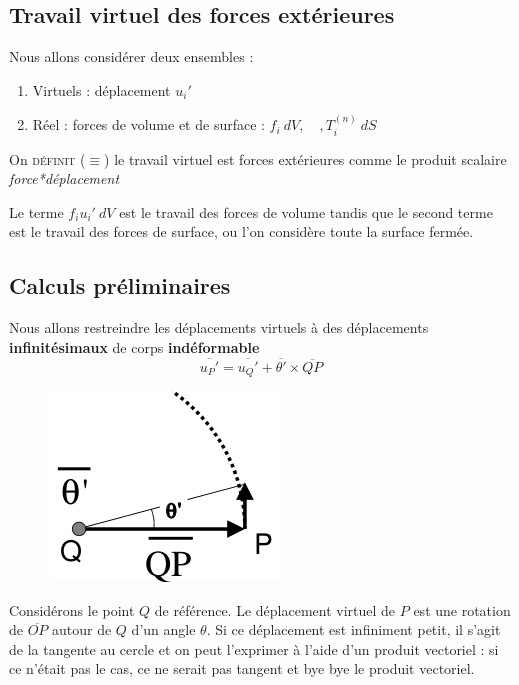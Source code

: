	
	\subsection{Travail virtuel des forces extérieures}
	Nous allons considérer deux ensembles :
	\begin{enumerate}
	\item Virtuels : déplacement $u_i'$
	\item Réel : forces de volume et de surface : $f_i\ dV,\quad, T_i^{(n)}\ dS$
	\end{enumerate}
	On \textsc{définit} ($\equiv$) le travail virtuel est forces extérieures comme 
	le produit scalaire \textit{force*déplacement}
	\ 
	
	Le terme $f_iu_i'\ dV$ est le travail des forces de volume tandis que le second 
	terme est le travail des forces de surface, ou l'on considère toute la surface 
	fermée.


	\subsection{Calculs préliminaires}
	Nous allons restreindre les déplacements virtuels à des déplacements 
	\textbf{infinitésimaux} de corps \textbf{indéformable} 
	\begin{equation}
	\overline{u_P'} = \overline{u_Q'} + \overline{\theta'}\times\overline{QP}
	\end{equation}
	\begin{figure}
	\vspace{-5mm}
	\includegraphics[scale=0.4]{ch8/image1.png}
	\end{figure}
	Considérons le point $Q$ de référence. Le déplacement virtuel de $P$ est 
	une rotation de $\overline{OP}$ autour de $Q$ d'un angle $\theta$. Si 
	ce déplacement est infiniment petit, il s'agit de la tangente au cercle et 
	on peut l'exprimer à l'aide d'un produit vectoriel : si ce n'était pas le 
	cas, ce ne serait pas tangent et bye bye le produit vectoriel.\\
	

